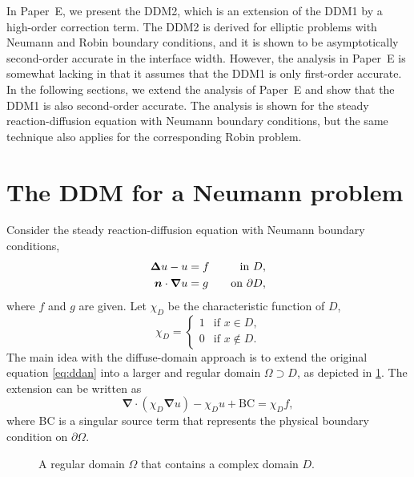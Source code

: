 \documentclass[11pt,b5paper,DIV=calc,BCOR1.3cm,headings=small,%
               footinclude=false,headsepline]{scrbook}
\newcommand*{\vct}[1]{\ensuremath{\boldsymbol{#1}}}
\newcommand*{\del}{\boldsymbol\nabla}
\renewcommand*{\div}{\del\cdot}
\newcommand*{\grad}{\del}
\newcommand*{\lapl}{\boldsymbol\Delta}
\newcommand*{\ndot}{\ensuremath{\vct n\cdot}}
\newcommand*{\txin}{\ensuremath{\textup{in}\ }}
\newcommand*{\txon}{\ensuremath{\textup{on}\ }}
\begin{document}
In Paper~E, we present the DDM2, which is an extension of the DDM1 by
a high-order correction term.  The DDM2 is derived for elliptic problems with
Neumann and Robin boundary conditions, and it is shown to be asymptotically
second-order accurate in the interface width.  However, the analysis in Paper~E
is somewhat lacking in that it assumes that the DDM1 is only first-order
accurate.  In the following sections, we extend the analysis of Paper~E and
show that the DDM1 is also second-order accurate.  The analysis is shown for
the steady reaction-diffusion equation with Neumann boundary conditions, but
the same technique also applies for the corresponding Robin problem.

\section{The DDM for a Neumann problem}
Consider the steady reaction-diffusion equation with Neumann boundary
conditions,
\begin{equation}
  \begin{alignedat}{2}
    \lapl u - u  &= f        & \txin D, \\
    \ndot\grad u &= g \qquad & \txon \partial D,
  \end{alignedat}
  \label{eq:ddan}
\end{equation}
where $f$ and $g$ are given.  Let $\chi_D$ be the characteristic function of
$D$,
\begin{equation}
  \chi_D = \begin{cases}
    1 & \text{if $x\in D$,} \\
    0 & \text{if $x\notin D$.}
  \end{cases}
\end{equation}
The main idea with the diffuse-domain approach is to extend the original
equation \eqref{eq:ddan} into a larger and regular domain $\Omega\supset D$, as
depicted in \cref{fig:ddadomain}.  The extension can be written as
\begin{equation}
  \div(\chi_D\grad u) - \chi_D u + \text{BC} = \chi_D f,
  \label{eq:ddm}
\end{equation}
where BC is a singular source term that represents the physical boundary
condition on $\partial\Omega$.
\begin{figure}[tbp]
  \centering
  \caption{A regular domain $\Omega$ that contains a complex domain $D$.}
  \label{fig:ddadomain}
\end{figure}
\end{document}
